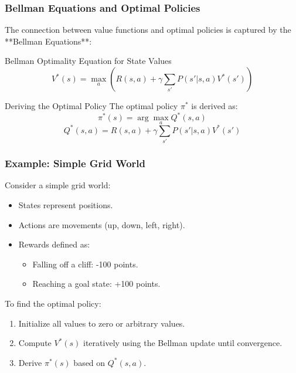 \documentclass[aspectratio=169]{beamer}
\begin{document}
\begin{frame}[fragile]
    \frametitle{Bellman Equations and Optimal Policies}
    The connection between value functions and optimal policies is captured by the **Bellman Equations**:
    
    \begin{block}{Bellman Optimality Equation for State Values}
        \begin{equation}
            V^*(s) = \max_a \left( R(s, a) + \gamma \sum_{s'} P(s'|s,a) V^*(s') \right)
        \end{equation}
    \end{block}

    \begin{block}{Deriving the Optimal Policy}
        The optimal policy \( \pi^* \) is derived as:
        \begin{equation}
            \pi^*(s) = \arg\max_a Q^*(s, a)
        \end{equation}
        \begin{equation}
            Q^*(s, a) = R(s, a) + \gamma \sum_{s'} P(s'|s,a) V^*(s')
        \end{equation}
    \end{block}
\end{frame}

\begin{frame}[fragile]
    \frametitle{Example: Simple Grid World}
    Consider a simple grid world:
    \begin{itemize}
        \item States represent positions.
        \item Actions are movements (up, down, left, right).
        \item Rewards defined as:
        \begin{itemize}
            \item Falling off a cliff: -100 points.
            \item Reaching a goal state: +100 points.
        \end{itemize}
    \end{itemize}

    To find the optimal policy:
    \begin{enumerate}
        \item Initialize all values to zero or arbitrary values.
        \item Compute \( V^*(s) \) iteratively using the Bellman update until convergence.
        \item Derive \( \pi^*(s) \) based on \( Q^*(s, a) \).
    \end{enumerate}
\end{frame}
\end{document}
